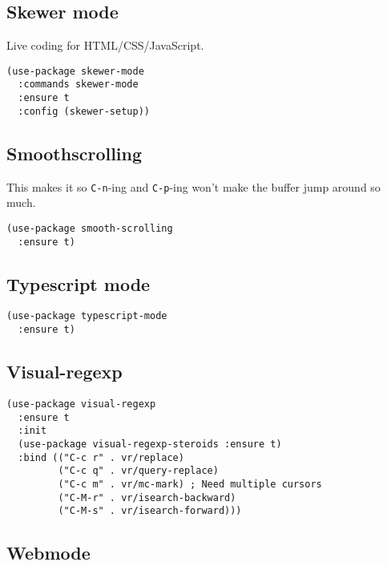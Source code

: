 \documentclass[11pt]{article}
\begin{document}
\subsection{Skewer mode}
\label{sec-18-32}

Live coding for HTML/CSS/JavaScript.

\begin{verbatim}
(use-package skewer-mode
  :commands skewer-mode
  :ensure t
  :config (skewer-setup))
\end{verbatim}

\subsection{Smoothscrolling}
\label{sec-18-33}

This makes it so \verb~C-n~-ing and \verb~C-p~-ing won't make the buffer jump
around so much.

\begin{verbatim}
(use-package smooth-scrolling
  :ensure t)
\end{verbatim}

\subsection{Typescript mode}
\label{sec-18-34}

\begin{verbatim}
(use-package typescript-mode
  :ensure t)
\end{verbatim}

\subsection{Visual-regexp}
\label{sec-18-35}

\begin{verbatim}
(use-package visual-regexp
  :ensure t
  :init
  (use-package visual-regexp-steroids :ensure t)
  :bind (("C-c r" . vr/replace)
         ("C-c q" . vr/query-replace)
         ("C-c m" . vr/mc-mark) ; Need multiple cursors
         ("C-M-r" . vr/isearch-backward)
         ("C-M-s" . vr/isearch-forward)))
\end{verbatim}

\subsection{Webmode}
\label{sec-18-36}
\end{document}
